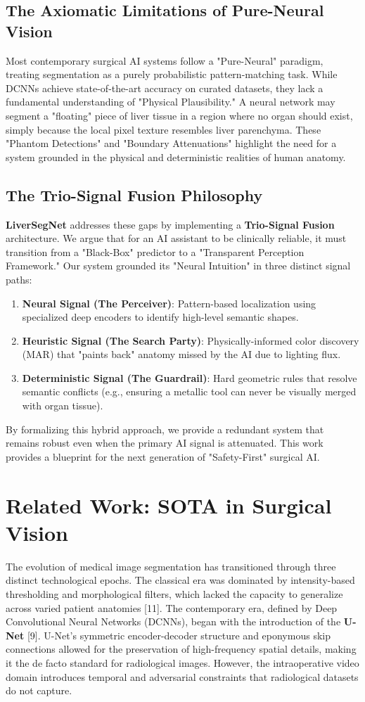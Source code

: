 \documentclass[conference]{IEEEtran}
\begin{document}
\subsection{The Axiomatic Limitations of Pure-Neural Vision}
Most contemporary surgical AI systems follow a "Pure-Neural" paradigm, treating segmentation as a purely probabilistic pattern-matching task. While DCNNs achieve state-of-the-art accuracy on curated datasets, they lack a fundamental understanding of "Physical Plausibility." A neural network may segment a "floating" piece of liver tissue in a region where no organ should exist, simply because the local pixel texture resembles liver parenchyma. These "Phantom Detections" and "Boundary Attenuations" highlight the need for a system grounded in the physical and deterministic realities of human anatomy.

\subsection{The Trio-Signal Fusion Philosophy}
\textbf{LiverSegNet} addresses these gaps by implementing a \textbf{Trio-Signal Fusion} architecture. We argue that for an AI assistant to be clinically reliable, it must transition from a "Black-Box" predictor to a "Transparent Perception Framework." Our system grounded its "Neural Intuition" in three distinct signal paths:
\begin{enumerate}
    \item \textbf{Neural Signal (The Perceiver)}: Pattern-based localization using specialized deep encoders to identify high-level semantic shapes.
    \item \textbf{Heuristic Signal (The Search Party)}: Physically-informed color discovery (MAR) that "paints back" anatomy missed by the AI due to lighting flux.
    \item \textbf{Deterministic Signal (The Guardrail)}: Hard geometric rules that resolve semantic conflicts (e.g., ensuring a metallic tool can never be visually merged with organ tissue).
\end{enumerate}
By formalizing this hybrid approach, we provide a redundant system that remains robust even when the primary AI signal is attenuated. This work provides a blueprint for the next generation of "Safety-First" surgical AI.

\section{Related Work: SOTA in Surgical Vision}
The evolution of medical image segmentation has transitioned through three distinct technological epochs. The classical era was dominated by intensity-based thresholding and morphological filters, which lacked the capacity to generalize across varied patient anatomies [11]. The contemporary era, defined by Deep Convolutional Neural Networks (DCNNs), began with the introduction of the \textbf{U-Net} [9]. U-Net's symmetric encoder-decoder structure and eponymous skip connections allowed for the preservation of high-frequency spatial details, making it the de facto standard for radiological images. However, the intraoperative video domain introduces temporal and adversarial constraints that radiological datasets do not capture.
\end{document}
